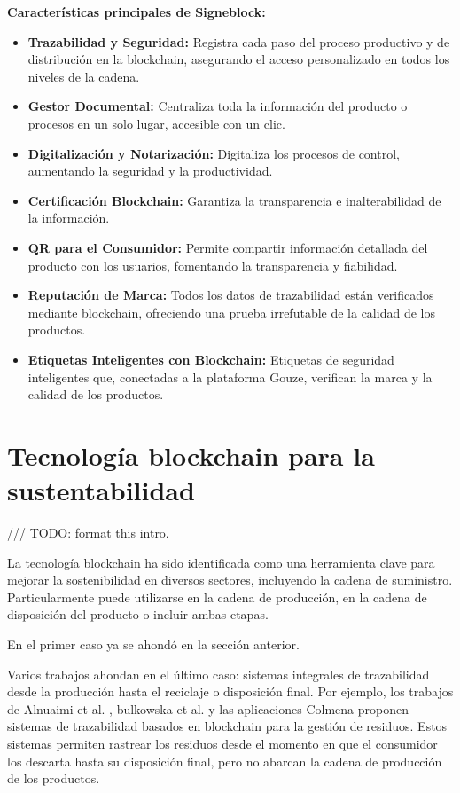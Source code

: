 \documentclass[main.tex]{subfiles}
\begin{document}
\textbf{Características principales de Signeblock:}
\begin{itemize}
  \item \textbf{Trazabilidad y Seguridad:} Registra cada paso del proceso productivo y de distribución en la blockchain, asegurando el acceso personalizado en todos los niveles de la cadena.
  \item \textbf{Gestor Documental:} Centraliza toda la información del producto o procesos en un solo lugar, accesible con un clic.
  \item \textbf{Digitalización y Notarización:} Digitaliza los procesos de control, aumentando la seguridad y la productividad.
  \item \textbf{Certificación Blockchain:} Garantiza la transparencia e inalterabilidad de la información.
  \item \textbf{QR para el Consumidor:} Permite compartir información detallada del producto con los usuarios, fomentando la transparencia y fiabilidad.
  \item \textbf{Reputación de Marca:} Todos los datos de trazabilidad están verificados mediante blockchain, ofreciendo una prueba irrefutable de la calidad de los productos.
  \item \textbf{Etiquetas Inteligentes con Blockchain:} Etiquetas de seguridad inteligentes que, conectadas a la plataforma Gouze, verifican la marca y la calidad de los productos.
\end{itemize}

\section{Tecnología blockchain para la sustentabilidad}

/// TODO: format this intro.

La tecnología blockchain ha sido identificada como una herramienta clave para mejorar la sostenibilidad en diversos sectores, incluyendo la cadena de suministro. Particularmente puede utilizarse en la cadena de producción, en la cadena de disposición del producto o incluir ambas etapas.

En el primer caso ya se ahondó en la sección anterior.

Varios trabajos ahondan en el último caso: sistemas integrales de trazabilidad desde la producción hasta el reciclaje o disposición final. Por ejemplo, los trabajos de Alnuaimi et al. \cite{alnuaimi2023blockchain}, bulkowska et al. \cite{bulkowska2023implementation} y las aplicaciones Colmena \cite{colmena2024} proponen sistemas de trazabilidad basados en blockchain para la gestión de residuos. Estos sistemas permiten rastrear los residuos desde el momento en que el consumidor los descarta hasta su disposición final, pero no abarcan la cadena de producción de los productos.
\end{document}
